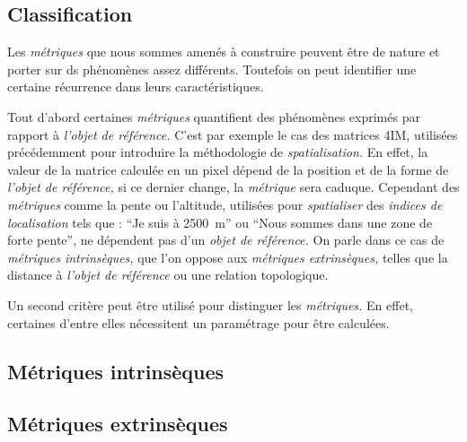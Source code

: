 

\subsection{Classification}

Les \emph{métriques} que nous sommes amenés à construire peuvent être
de nature et porter sur ds phénomènes assez différents. Toutefois on
peut identifier une certaine récurrence dans leurs
caractéristiques.

Tout d'abord certaines \emph{métriques} quantifient des phénomènes
exprimés par rapport à \emph{l'objet de référence.}  C'est par exemple
le cas des matrices 4IM, utilisées précédemment pour introduire la
méthodologie de \emph{spatialisation.} En effet, la valeur de la
matrice calculée en un pixel dépend de la position et de la forme de
\emph{l'objet de référence,} si ce dernier change, la \emph{métrique}
sera caduque. Cependant des \emph{métriques} comme la pente ou
l'altitude, utilisées pour \emph{spatialiser} des \emph{indices de
  localisation} tels que : \enquote{Je suis à \SI{2500}{\meter}} ou
\enquote{Nous sommes dans une zone de forte pente}, ne dépendent pas
d'un \emph{objet de référence.} On parle dans ce cas de
\emph{métriques intrinsèques,} que l'on oppose aux \emph{métriques
  extrinsèques,} telles que la distance à \emph{l'objet de référence}
ou une relation topologique.

Un second critère peut être utilisé pour distinguer les
\emph{métriques.} En effet, certaines d'entre elles nécessitent un
paramétrage pour être calculées. 


\subsection{Métriques intrinsèques}



\subsection{Métriques extrinsèques}


